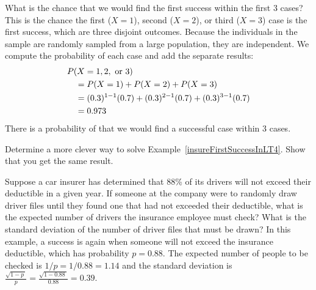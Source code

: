 \begin{examplewrap}
\begin{nexample}{What is the chance that we would find
    the first success within the first 3 cases?}
  \label{insureFirstSuccessInLT4}%
  This is the chance the first ($X=1$), second ($X=2$),
  or third ($X=3$) case is the first success, which are three
  disjoint outcomes.
  Because the individuals in the sample are randomly sampled
  from a large population, they are independent.
  We compute the probability of each case and add the separate
  results:
  \begin{align*}
  &P(X=1, 2, \text{ or }3) \\
    & \quad = P(X=1)+P(X=2)+P(X=3) \\
    & \quad = (0.3{})^{1-1}(0.7{})
        + (0.3{})^{2-1}(0.7{})
        + (0.3{})^{3-1}(0.7{}) \\
    & \quad = 0.973{}
  \end{align*}
  There is a probability of \insureCDistC{} that we would
  find a successful case within 3 cases.
\end{nexample}
\end{examplewrap}

\begin{exercisewrap}
\begin{nexercise}
Determine a more clever way to solve Example~\ref{insureFirstSuccessInLT4}.
Show that you get the same result.\footnotemark{}
\end{nexercise}
\end{exercisewrap}

\begin{examplewrap}
\begin{nexample}{Suppose a car insurer has determined
    that 88\% of its drivers will not exceed their deductible
    in a given year.
    If someone at the company were to randomly draw
    driver files until they found one that had not exceeded
    their deductible, what is the expected number of drivers
    the insurance employee must check?
    What is the standard deviation of the number of driver files
    that must be drawn?}
  \label{carInsure08DrawOne}%
  In this example, a success is again when someone will not
  exceed the insurance deductible, which has probability
  $p = 0.88$.
  The expected number of people to be checked is
  $1 / p = 1 / 0.88 = 1.14$ and the standard deviation is
  $\frac{\sqrt{1-p\ }}{p}=\frac{\sqrt{1-0.88\ }}{0.88} = 0.39$.
\end{nexample}
\end{examplewrap}


